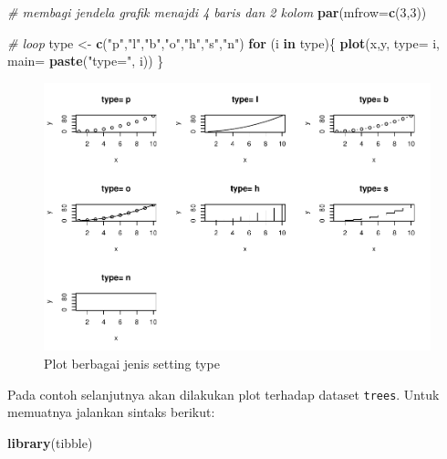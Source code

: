 \documentclass[]{book}
\newenvironment{Shaded}{\begin{snugshade}}{\end{snugshade}}
\newcommand{\KeywordTok}[1]{\textcolor[rgb]{0.13,0.29,0.53}{\textbf{#1}}}
\newcommand{\DataTypeTok}[1]{\textcolor[rgb]{0.13,0.29,0.53}{#1}}
\newcommand{\DecValTok}[1]{\textcolor[rgb]{0.00,0.00,0.81}{#1}}
\newcommand{\StringTok}[1]{\textcolor[rgb]{0.31,0.60,0.02}{#1}}
\newcommand{\CommentTok}[1]{\textcolor[rgb]{0.56,0.35,0.01}{\textit{#1}}}
\newcommand{\ControlFlowTok}[1]{\textcolor[rgb]{0.13,0.29,0.53}{\textbf{#1}}}
\newcommand{\NormalTok}[1]{#1}
\begin{document}
\begin{Shaded}
\begin{Highlighting}[]
\CommentTok{# membagi jendela grafik menajdi 4 baris dan 2 kolom}
\KeywordTok{par}\NormalTok{(}\DataTypeTok{mfrow=}\KeywordTok{c}\NormalTok{(}\DecValTok{3}\NormalTok{,}\DecValTok{3}\NormalTok{))}

\CommentTok{# loop}
\NormalTok{type <-}\StringTok{ }\KeywordTok{c}\NormalTok{(}\StringTok{"p"}\NormalTok{,}\StringTok{"l"}\NormalTok{,}\StringTok{"b"}\NormalTok{,}\StringTok{"o"}\NormalTok{,}\StringTok{"h"}\NormalTok{,}\StringTok{"s"}\NormalTok{,}\StringTok{"n"}\NormalTok{)}
\ControlFlowTok{for}\NormalTok{ (i }\ControlFlowTok{in}\NormalTok{ type)\{}
  \KeywordTok{plot}\NormalTok{(x,y, }\DataTypeTok{type=}\NormalTok{ i,}
       \DataTypeTok{main=} \KeywordTok{paste}\NormalTok{(}\StringTok{"type="}\NormalTok{, i))}
\NormalTok{\}}
\end{Highlighting}
\end{Shaded}

\begin{figure}

{\centering \includegraphics[width=0.8\linewidth]{EnvStat_files/figure-latex/plot-1} 

}

\caption{Plot berbagai jenis setting type}\label{fig:plot}
\end{figure}

Pada contoh selanjutnya akan dilakukan plot terhadap dataset
\texttt{trees}. Untuk memuatnya jalankan sintaks berikut:

\begin{Shaded}
\begin{Highlighting}[]
\KeywordTok{library}\NormalTok{(tibble)}
\end{Highlighting}
\end{Shaded}
\end{document}
